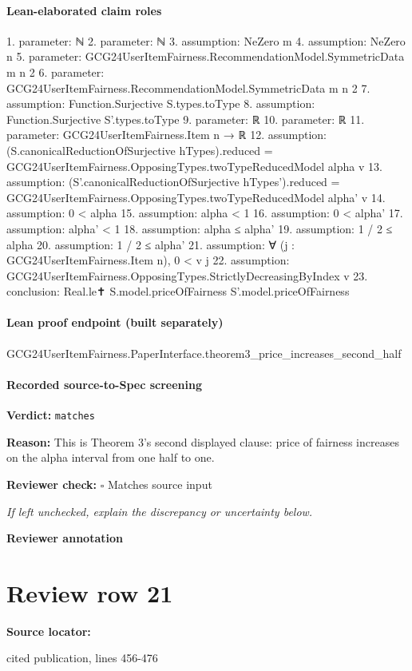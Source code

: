 \documentclass[10pt]{article}
\newcommand{\reviewerbox}{%
  \par\noindent\fbox{\parbox{0.96\linewidth}{\rule{0pt}{0.38in}}}\par
}
\newcommand{\reviewmatch}[1]{%
  \par\noindent\textbf{Reviewer check:} $\square$\; #1\par
  \noindent\emph{If left unchecked, explain the discrepancy or uncertainty below.}\par
}
\begin{document}
\paragraph{Lean-elaborated claim roles}\begin{ReviewVerbatim}
1. parameter: ℕ
2. parameter: ℕ
3. assumption: NeZero m
4. assumption: NeZero n
5. parameter: GCG24UserItemFairness.RecommendationModel.SymmetricData m n 2
6. parameter: GCG24UserItemFairness.RecommendationModel.SymmetricData m n 2
7. assumption: Function.Surjective S.types.toType
8. assumption: Function.Surjective S'.types.toType
9. parameter: ℝ
10. parameter: ℝ
11. parameter: GCG24UserItemFairness.Item n → ℝ
12. assumption: (S.canonicalReductionOfSurjective hTypes).reduced = GCG24UserItemFairness.OpposingTypes.twoTypeReducedModel alpha v
13. assumption: (S'.canonicalReductionOfSurjective hTypes').reduced = GCG24UserItemFairness.OpposingTypes.twoTypeReducedModel alpha' v
14. assumption: 0 < alpha
15. assumption: alpha < 1
16. assumption: 0 < alpha'
17. assumption: alpha' < 1
18. assumption: alpha ≤ alpha'
19. assumption: 1 / 2 ≤ alpha
20. assumption: 1 / 2 ≤ alpha'
21. assumption: ∀ (j : GCG24UserItemFairness.Item n), 0 < v j
22. assumption: GCG24UserItemFairness.OpposingTypes.StrictlyDecreasingByIndex v
23. conclusion: Real.le✝ S.model.priceOfFairness S'.model.priceOfFairness
\end{ReviewVerbatim}

\paragraph{Lean proof endpoint (built separately)}\begin{ReviewVerbatim}
GCG24UserItemFairness.PaperInterface.theorem3_price_increases_second_half
\end{ReviewVerbatim}

\paragraph{Recorded source-to-Spec screening}
\textbf{Verdict:} \texttt{matches}
\\
{\raggedright
\textbf{Reason:} This is Theorem 3's second displayed clause:\allowbreak{} price of fairness increases on the alpha interval from one half to one.\allowbreak{}
\par}
\reviewmatch{Matches source input}
\noindent\textbf{Reviewer annotation}\par
\reviewerbox
\clearpage
\hypertarget{source-claim-d63dd1782000f9f6}{}
\section*{Review row 21}
\textbf{Source locator:} {\footnotesize\raggedright cited publication, lines 456-\allowbreak{}476\par}
\end{document}
